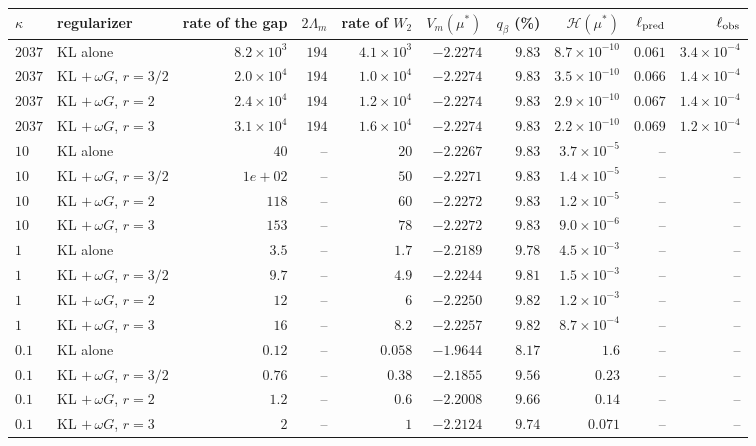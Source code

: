 \setlength{\tabcolsep}{4pt}\begin{tabular}{llrrrrrrrr}
\toprule
$\kappa$ & regularizer & rate of the gap & $2\Lambda_m$ & rate of $W_2$ & $V_m(\mu^*)$ & $q_\beta$ (\%) & $\mathcal H(\mu^*)$ & $\ell_{\rm pred}$ & $\ell_{\rm obs}$ \\
\midrule
$2037$ & KL alone & $8.2\times10^{3}$ & $194$ & $4.1\times10^{3}$ & $-2.2274$ & $9.83$ & $8.7\times10^{-10}$ & $0.061$ & $3.4\times10^{-4}$ \\
$2037$ & KL $+\,\omega G$, $r=3/2$ & $2.0\times10^{4}$ & $194$ & $1.0\times10^{4}$ & $-2.2274$ & $9.83$ & $3.5\times10^{-10}$ & $0.066$ & $1.4\times10^{-4}$ \\
$2037$ & KL $+\,\omega G$, $r=2$ & $2.4\times10^{4}$ & $194$ & $1.2\times10^{4}$ & $-2.2274$ & $9.83$ & $2.9\times10^{-10}$ & $0.067$ & $1.4\times10^{-4}$ \\
$2037$ & KL $+\,\omega G$, $r=3$ & $3.1\times10^{4}$ & $194$ & $1.6\times10^{4}$ & $-2.2274$ & $9.83$ & $2.2\times10^{-10}$ & $0.069$ & $1.2\times10^{-4}$ \\
$10$ & KL alone & $40$ & -- & $20$ & $-2.2267$ & $9.83$ & $3.7\times10^{-5}$ & -- & -- \\
$10$ & KL $+\,\omega G$, $r=3/2$ & $1e+02$ & -- & $50$ & $-2.2271$ & $9.83$ & $1.4\times10^{-5}$ & -- & -- \\
$10$ & KL $+\,\omega G$, $r=2$ & $118$ & -- & $60$ & $-2.2272$ & $9.83$ & $1.2\times10^{-5}$ & -- & -- \\
$10$ & KL $+\,\omega G$, $r=3$ & $153$ & -- & $78$ & $-2.2272$ & $9.83$ & $9.0\times10^{-6}$ & -- & -- \\
$1$ & KL alone & $3.5$ & -- & $1.7$ & $-2.2189$ & $9.78$ & $4.5\times10^{-3}$ & -- & -- \\
$1$ & KL $+\,\omega G$, $r=3/2$ & $9.7$ & -- & $4.9$ & $-2.2244$ & $9.81$ & $1.5\times10^{-3}$ & -- & -- \\
$1$ & KL $+\,\omega G$, $r=2$ & $12$ & -- & $6$ & $-2.2250$ & $9.82$ & $1.2\times10^{-3}$ & -- & -- \\
$1$ & KL $+\,\omega G$, $r=3$ & $16$ & -- & $8.2$ & $-2.2257$ & $9.82$ & $8.7\times10^{-4}$ & -- & -- \\
$0.1$ & KL alone & $0.12$ & -- & $0.058$ & $-1.9644$ & $8.17$ & $1.6$ & -- & -- \\
$0.1$ & KL $+\,\omega G$, $r=3/2$ & $0.76$ & -- & $0.38$ & $-2.1855$ & $9.56$ & $0.23$ & -- & -- \\
$0.1$ & KL $+\,\omega G$, $r=2$ & $1.2$ & -- & $0.6$ & $-2.2008$ & $9.66$ & $0.14$ & -- & -- \\
$0.1$ & KL $+\,\omega G$, $r=3$ & $2$ & -- & $1$ & $-2.2124$ & $9.74$ & $0.071$ & -- & -- \\
\bottomrule
\end{tabular}
